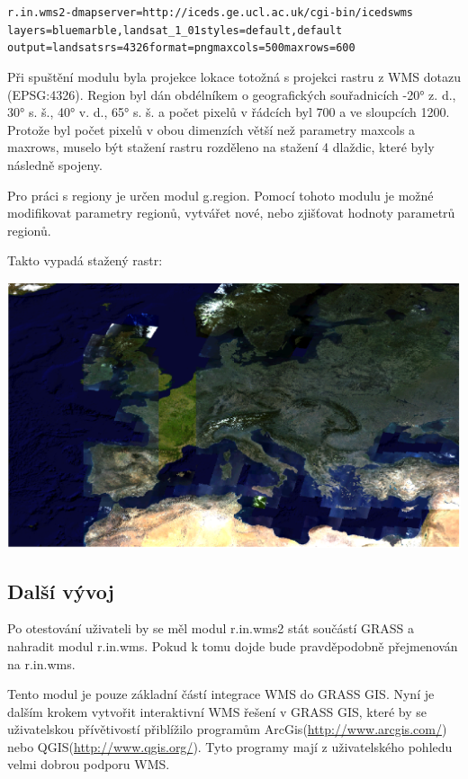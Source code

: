 \documentclass[a4paper,12pt]{article}
\begin{document}
\begin{alltt}\footnotesize
r.in.wms2 -d mapserver=http://iceds.ge.ucl.ac.uk/cgi-bin/icedswms \\ layers=bluemarble,landsat\_1\_01 styles=default,default
output=landsat srs=4326 format=png maxcols=500 maxrows=600
\end{alltt}

Při spuštění modulu byla projekce lokace totožná s projekci rastru z
WMS dotazu (EPSG:4326). Region byl dán obdélníkem o geografických
souřadnicích -20° z. d., 30° s. š., 40° v. d., 65° s. š. a počet
pixelů v řádcích byl 700 a ve sloupcích 1200. Protože byl počet pixelů
v obou dimenzích větší než parametry maxcols a maxrows, muselo být
stažení rastru rozděleno na stažení 4 dlaždic, které byly následně
spojeny.

Pro práci s regiony je určen modul g.region. Pomocí tohoto modulu je
možné modifikovat parametry regionů, vytvářet nové, nebo zjišťovat
hodnoty parametrů regionů.

Takto vypadá stažený rastr:

\includegraphics[scale=0.28]{figures/GRASS_WMS_obrazek.png}


\subsection{Další vývoj}

Po otestování uživateli by se měl modul r.in.wms2 stát součástí GRASS
a nahradit modul r.in.wms. Pokud k tomu dojde bude pravděpodobně
přejmenován na r.in.wms.

Tento modul je pouze základní částí integrace WMS do GRASS GIS. Nyní
je dalším krokem vytvořit interaktivní WMS řešení v GRASS GIS, které
by se uživatelskou přívětivostí přiblížilo programům
ArcGis(\url{http://www.arcgis.com/}) nebo
QGIS(\url{http://www.qgis.org/}). Tyto programy mají z uživatelského
pohledu velmi dobrou podporu WMS.
\end{document}
